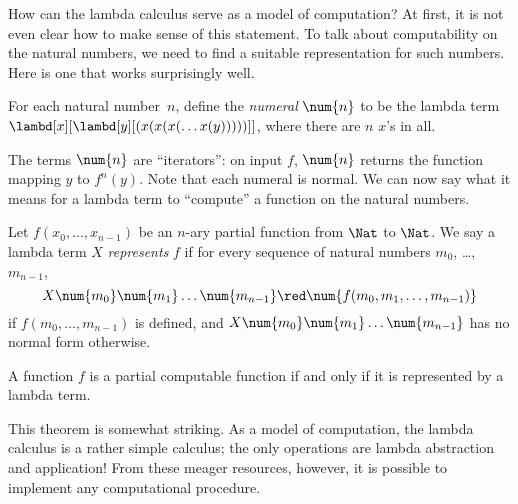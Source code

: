 \documentclass[../../../include/open-logic-section]{subfiles}
\begin{document}

How can the lambda calculus serve as a model of computation? At first,
it is not even clear how to make sense of this statement. To talk
about computability on the natural numbers, we need to find a suitable
representation for such numbers. Here is one that works surprisingly
well.

\begin{defn}
For each natural number~$n$, define the \emph{numeral} $\num{n}$ to be
the lambda term $\lambd[x][\lambd[y][(x(x(x(\dots x(y)))))]]$, where
there are $n$ $x$'s in all.
\end{defn}

The terms $\num{n}$ are ``iterators'': on input $f$, $\num{n}$ returns
the function mapping $y$ to $f^n(y)$. Note that each numeral is
normal. We can now say what it means for a lambda term to ``compute''
a function on the natural numbers.

\begin{defn}
Let $f(x_0, \dots, x_{n-1})$ be an $n$-ary partial function from $\Nat$
to $\Nat$. We say a lambda term $X$ \emph{represents} $f$ if for every
sequence of natural numbers $m_0$, \dots,~$m_{n-1}$,
\[
X \num{m_0} \num{m_1} \dots \num{m_{n-1}} \red \num{f(m_0, m_1, \dots,
  m_{n-1})}
\]
if $f(m_0, \dots, m_{n-1})$ is defined, and $X \num{m_0} \num{m_1}
\dots \num{m_{n-1}}$ has no normal form otherwise.
\end{defn}

\begin{thm}
A function $f$ is a partial computable function if and only if it is
represented by a lambda term.
\end{thm}

\begin{explain}
This theorem is somewhat striking. As a model of computation, the
lambda calculus is a rather simple calculus; the only operations are
lambda abstraction and application!{} From these meager resources,
however, it is possible to implement any computational procedure.
\end{explain}
\end{document}
